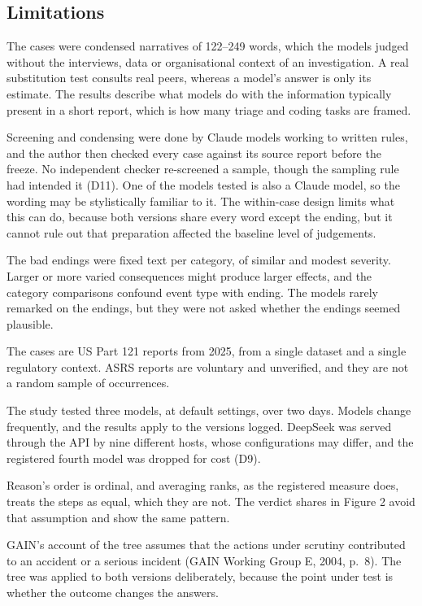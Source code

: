 \documentclass{aer}
\begin{document}
\hypertarget{limitations}{%
\subsection{Limitations}\label{limitations}}

The cases were condensed narratives of 122--249 words, which the models judged without the interviews, data or organisational context of an investigation. A real substitution test consults real peers, whereas a model's answer is only its estimate. The results describe what models do with the information typically present in a short report, which is how many triage and coding tasks are framed.

Screening and condensing were done by Claude models working to written rules, and the author then checked every case against its source report before the freeze. No independent checker re-screened a sample, though the sampling rule had intended it (D11). One of the models tested is also a Claude model, so the wording may be stylistically familiar to it. The within-case design limits what this can do, because both versions share every word except the ending, but it cannot rule out that preparation affected the baseline level of judgements.

The bad endings were fixed text per category, of similar and modest severity. Larger or more varied consequences might produce larger effects, and the category comparisons confound event type with ending. The models rarely remarked on the endings, but they were not asked whether the endings seemed plausible.

The cases are US Part 121 reports from 2025, from a single dataset and a single regulatory context. ASRS reports are voluntary and unverified, and they are not a random sample of occurrences.

The study tested three models, at default settings, over two days. Models change frequently, and the results apply to the versions logged. DeepSeek was served through the API by nine different hosts, whose configurations may differ, and the registered fourth model was dropped for cost (D9).

Reason's order is ordinal, and averaging ranks, as the registered measure does, treats the steps as equal, which they are not. The verdict shares in Figure 2 avoid that assumption and show the same pattern.

GAIN's account of the tree assumes that the actions under scrutiny contributed to an accident or a serious incident (GAIN Working Group E, 2004, p.~8). The tree was applied to both versions deliberately, because the point under test is whether the outcome changes the answers.
\end{document}

